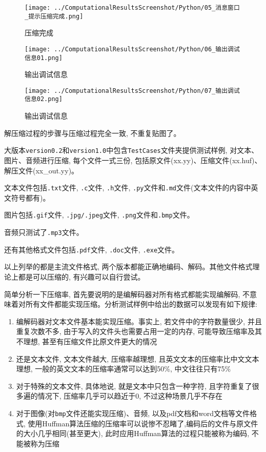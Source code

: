 \documentclass[a4paper]{ctexart}
\begin{document}
\begin{figure}[H]
\centering
\texttt{[image: ../ComputationalResultsScreenshot/Python/05\_消息窗口\_提示压缩完成.png]}
\caption{压缩完成}
\end{figure}

\begin{figure}[H]
\centering
\texttt{[image: ../ComputationalResultsScreenshot/Python/06\_输出调试信息01.png]}
\caption{输出调试信息}
\end{figure}

\begin{figure}[H]
\centering
\texttt{[image: ../ComputationalResultsScreenshot/Python/07\_输出调试信息02.png]}
\caption{输出调试信息}
\end{figure}

解压缩过程的步骤与压缩过程完全一致, 不重复贴图了。

大版本\texttt{version0.2}和\texttt{version1.0}中包含\texttt{TestCases}文件夹提供测试样例, 对文本、图片、音频进行压缩, 每个文件一式三份, 包括原文件(xx.yy)、压缩文件(xx.huf)、解压文件(xx\_out.yy)。

文本文件包括\texttt{.txt}文件, \texttt{.c}文件, \texttt{.h}文件, \texttt{.py}文件和\texttt{.md}文件(文本文件的内容中英文符号都有)。

图片包括\texttt{.gif}文件, \texttt{.jpg/.jpeg}文件, \texttt{.png}文件和\texttt{.bmp}文件。

音频只测试了\texttt{.mp3}文件。

还有其他格式文件包括\texttt{.pdf}文件, \texttt{.doc}文件, \texttt{.exe}文件。

以上列举的都是主流文件格式, 两个版本都能正确地编码、解码。其他文件格式理论上都是可以压缩的, 有兴趣可以自行尝试。

简单分析一下压缩率, 首先要说明的是编解码器对所有格式都能实现编解码, 不意味着对所有文件都能实现压缩。分析测试样例中给出的数据可以发现有如下规律:

\begin{enumerate}
\def\labelenumi{\arabic{enumi}.}
\item
  编解码器对文本文件基本能实现压缩。事实上, 若文件中的字符数量很少, 并且重复次数不多, 由于写入的文件头也需要占用一定的内存, 可能导致压缩率及其不理想, 甚至有压缩文件比原文件更大的情况
\item
  还是文本文件, 文本文件越大, 压缩率越理想, 且英文文本的压缩率比中文文本理想, 一般的英文文本的压缩率通常可以达到50\%, 中文往往只有75\%
\item
  对于特殊的文本文件, 具体地说, 就是文本中只包含一种字符, 且字符重复了很多遍的情况下, 压缩率几乎可以趋近于0, 不过这种场景几乎不存在
\item
  对于图像(对\texttt{bmp}文件还能实现压缩)、音频, 以及pdf文档和word文档等文件格式, 使用Huffman算法压缩的压缩率可以说惨不忍睹了,编码后的文件与原文件的大小几乎相同(甚至更大), 此时应用Huffman算法的过程只能被称为编码, 不能被称为压缩
\end{enumerate}
\end{document}
